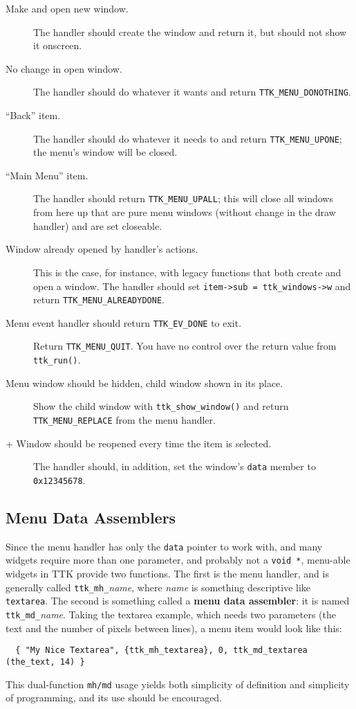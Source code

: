 \documentclass[12pt,letterpaper]{report}
\let\ttt\tt
\def\tt{\def\_{{\ttt\char`\_}}\ttt}
\begin{document}
\begin{description}
\item[Make and open new window.] The handler should create the window and return it, but should
not show it onscreen.
\item[No change in open window.] The handler should do whatever it wants and return
\verb|TTK_MENU_DONOTHING|.
\item[``Back'' item.] The handler should do whatever it needs to and return \verb|TTK_MENU_UPONE|;
the menu's window will be closed.
\item[``Main Menu'' item.] The handler should return \verb|TTK_MENU_UPALL|; this will close
all windows from here up that are pure menu windows (without change in the draw handler) and are set closeable.
\item[Window already opened by handler's actions.] This is the case, for instance, with legacy
functions that both create and open a window. The handler should set \verb|item->sub = ttk_windows->w| and
return \verb|TTK_MENU_ALREADYDONE|.
\item[Menu event handler should return {\tt TTK_EV_DONE} to exit.] Return \verb|TTK_MENU_QUIT|. You have
no control over the return value from \verb|ttk_run()|.
\item[Menu window should be hidden, child window shown in its place.] Show the child window with \verb|ttk_show_window()|
and return \verb|TTK_MENU_REPLACE| from the menu handler.
\item[+ Window should be reopened every time the item is selected.] The handler should, in addition, set
the window's \verb|data| member to \verb|0x12345678|.
\end{description}

\subsection{Menu Data Assemblers}
Since the menu handler has only the \verb|data| pointer to work with, and many widgets require more
than one parameter, and probably not a \verb|void *|, menu-able widgets in TTK provide two functions.
The first is the menu handler, and is generally called \verb|ttk_mh_|\emph{name}, where \emph{name} is something
descriptive like \verb|textarea|. The second is something called a {\bf menu data assembler}: it is named
\verb|ttk_md_|\emph{name}. Taking the textarea example, which needs two parameters (the text and the number
of pixels between lines), a menu item would look like this:
\begin{verbatim}
  { "My Nice Textarea", {ttk_mh_textarea}, 0, ttk_md_textarea (the_text, 14) }
\end{verbatim}
This dual-function {\tt mh{\rm/}md} usage yields both simplicity of definition and simplicity of programming,
and its use should be encouraged.
\end{document}
